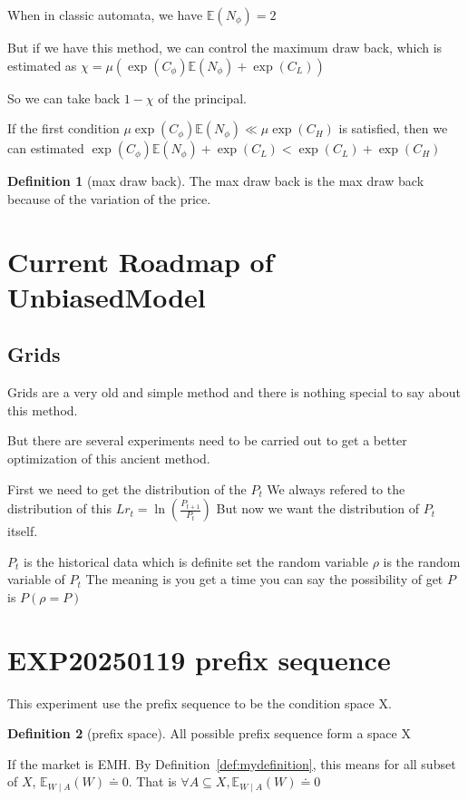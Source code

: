 \documentclass{article}
\theoremstyle{definition} %
\newtheorem{definition}{Definition}[section]
\begin{document}
When in classic automata, we have
$\mathbb{E}(N_{\phi})=2$

But if we have this method, we can control
the maximum draw back, which is
estimated as
$\chi=
    \mu
    (\exp(C_\phi)\mathbb{E}(N_{\phi})
    +
    \exp(C_L))$

So we can take back $1-\chi$
of the principal.

If the first condition
$\mu\exp(C_\phi)\mathbb{E}(N_{\phi})
    \ll
    \mu\exp(C_H)$
is satisfied, then we can
estimated
$\exp(C_\phi)\mathbb{E}(N_{\phi})
    +
    \exp(C_L)<\exp(C_L)+\exp(C_H)$

\begin{definition}[max draw back]
    \label{def:maxDrawBack}
    The max draw back is the max draw back
    because of the variation of the price.
\end{definition}

\section{Current Roadmap of UnbiasedModel}
\subsection{Grids}
Grids are a very old and simple method and
there is nothing special to say about this
method.

But there are several experiments need to
be carried out to get a better optimization
of this ancient method.

First we need to get the distribution of the
$P_t$
We always refered to the distribution of this
$Lr_t=\ln(\frac{P_{t+1}}{P_{t}})$
But now we want the distribution of $P_t$
itself.

$P_t$ is the historical data which is definite
set the random variable $\rho$ is the random
variable of $P_t$
The meaning is you get a time you can say the
possibility of get $P$ is $P(\rho=P)$


\section{EXP20250119 prefix sequence}
This experiment use the prefix sequence
to be the condition space X.

\begin{definition}[prefix space]
    All possible prefix sequence form a space X
\end{definition}

If the market is EMH.
By Definition~\ref{def:mydefinition}, this means
for all subset of $X$,
$\mathbb{E}_{W\mid A}(W)\doteq 0$. That is
$
    \forall A\subseteq X,
    \mathbb{E}_{W\mid A}(W)\doteq 0
$
\end{document}
